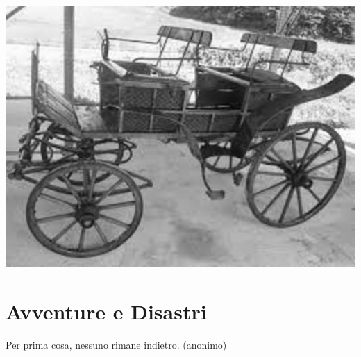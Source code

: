 \documentclass[a4paper,twoside,openany]{book}
\begin{document}
\vfill

\begin{center}
\includegraphics[width=0.5\linewidth]{immagini/carrozza.png}
\end{center}




\pagebreak

\section{Avventure e Disastri}

\label{avventure-e-disastri}
\begin{changemargin}{0.3cm}{0.3cm}\begin{enfasi}{
Per prima cosa, nessuno rimane indietro. (anonimo)}\end{enfasi}\end{changemargin}\medskip
\end{document}
